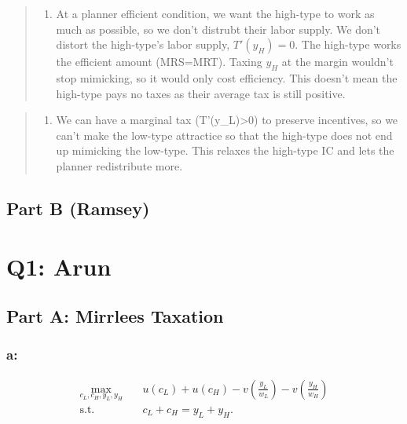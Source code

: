 \documentclass[
  letterpaper,
  DIV=11,
  numbers=noendperiod]{scrartcl}
\providecommand{\tightlist}{%
  \setlength{\itemsep}{0pt}\setlength{\parskip}{0pt}}
\begin{document}
\begin{quote}
\begin{enumerate}
\def\labelenumi{\arabic{enumi}.}
\setcounter{enumi}{1}
\tightlist
\item
  At a planner efficient condition, we want the high-type to work as
  much as possible, so we don't distrubt their labor supply. We don't
  distort the high-type's labor supply, \(T'(y_H)=0\). The high-type
  works the efficient amount (MRS=MRT). Taxing \(y_H\) at the margin
  wouldn't stop mimicking, so it would only cost efficiency. This
  doesn't mean the high-type pays no taxes as their average tax is still
  positive.
\end{enumerate}
\end{quote}

\begin{quote}
\begin{enumerate}
\def\labelenumi{\arabic{enumi}.}
\setcounter{enumi}{2}
\tightlist
\item
  We can have a marginal tax (T'(y\_L)\textgreater0) to preserve
  incentives, so we can't make the low-type attractice so that the
  high-type does not end up mimicking the low-type. This relaxes the
  high-type IC and lets the planner redistribute more.
\end{enumerate}
\end{quote}

\subsection{Part B (Ramsey)}\label{part-b-ramsey}

\breakpage

\section{Q1: Arun}\label{q1-arun}

\subsection{Part A: Mirrlees Taxation}\label{part-a-mirrlees-taxation}

\subsubsection{a:}\label{a}

\[
\begin{aligned}
\max_{c_L,c_H,y_L,y_H} \quad
& u(c_L)+u(c_H)
-v\left(\frac{y_L}{w_L}\right)
-v\left(\frac{y_H}{w_H}\right) \\
\text{s.t.} \quad
& c_L+c_H=y_L+y_H.
\end{aligned}
\]
\end{document}

